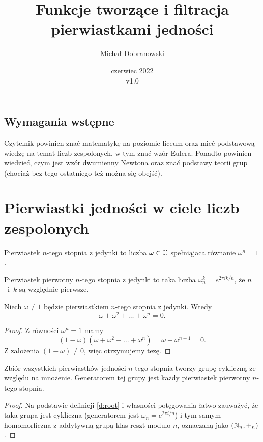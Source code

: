 \documentclass{scrartcl}
\title{Funkcje tworzące i filtracja pierwiastkami jedności}
\author{Michał Dobranowski}
\date{czerwiec 2022 \\ v1.0}
\begin{document}
    \maketitle
    \subsection*{Wymagania wstępne}
    Czytelnik powinien znać matematykę na poziomie liceum oraz mieć podstawową wiedzę na temat liczb zespolonych, w tym znać wzór Eulera. Ponadto powinien wiedzieć, czym jest wzór dwumienny Newtona oraz znać podstawy teorii grup (chociaż bez tego ostatniego też można się obejść).
    \tableofcontents
    \eject

\section{Pierwiastki jedności w ciele liczb zespolonych}
    \begin{definition}
        \label{d:root}
        Pierwiastek $n$-tego stopnia z jedynki to liczba $\omega \in \mathbb C$ spełniąjaca równanie $\omega^n = 1$.
    \end{definition}

    \begin{definition}
        Pierwiastek pierwotny $n$-tego stopnia z jedynki to taka liczba $\omega_n^k = e^{2\pi i k / n}$, że $n$~i~$k$ są względnie pierwsze.
    \end{definition}

    \begin{lemma}
        \label{l:roots_sum}
        Niech $\omega \neq 1$ będzie pierwiastkiem $n$-tego stopnia z jedynki. Wtedy
        $$ \omega + \omega^2 + \ldots + \omega^n = 0. $$
    \end{lemma}
    \begin{proof}
        Z równości $\omega^n = 1$ mamy
        $$ (1 - \omega)(\omega + \omega^2 + \ldots + \omega^n) = \omega - \omega^{n+1} = 0. $$
        Z założenia $(1 - \omega) \neq 0$, więc otrzymujemy tezę.
    \end{proof}

    \begin{lemma}
        \label{l:roots_group}
        Zbiór wszystkich pierwiastków jedności $n$-tego stopnia tworzy grupę cykliczną ze względu na mnożenie. Generatorem tej grupy jest każdy pierwiastek pierwotny $n$-tego stopnia.
    \end{lemma}
    \begin{proof}
        Na podstawie definicji \ref{d:root} i własności potęgowania łatwo zauważyć, że taka grupa jest cykliczna (generatorem jest $\omega_n = e^{2\pi i/n}$) i tym samym homomorficzna z addytywną grupą klas reszt modulo $n$, oznaczaną jako $(\mathbb N_n, +_n)$.
    \end{proof}
\end{document}
